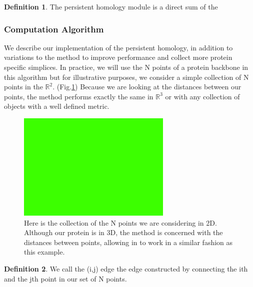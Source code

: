 \documentclass[12pt, a4paper, twocolumn, fullpage]{article}
\theoremstyle{plain}
\theoremstyle{definition}
\newtheorem{defn}{Definition}[section]
\theoremstyle{remark}
\begin{document}
\begin{defn}
The persistent homology module is a direct sum of the 
\end{defn}

\subsubsection{Computation Algorithm}
We describe our implementation of the persistent homology, in addition to variations to the method to improve performance and collect more protein specific simplices. 
In practice, we will use the N points of a protein backbone in this algorithm but for illustrative purposes, we consider a simple collection of N points in the $\mathbb{R}^2$. (Fig.\ref{Collection of points}) Because we are looking at the distances between our points, the method performs exactly the same in $\mathbb{R}^3$ or with any collection of objects with a well defined metric.

\begin{figure}[t]
    \includegraphics[width=\linewidth]{img/blank.png}
    \caption{Here is the collection of the N points we are considering in 2D. Although our protein is in 3D, the method is concerned with the distances between points, allowing in to work in a similar fashion as this example.}
    \label{Collection of points}
\end{figure}

\begin{defn}
We call the (i,j) edge the edge constructed by connecting the ith and the jth point in our set of N points.
\end{defn}
\end{document}
